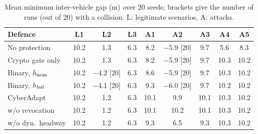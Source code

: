 \begin{table}[!t]\centering\caption{Mean minimum inter-vehicle gap (m) over 20 seeds; brackets give the number of runs (out of 20) with a collision. L: legitimate scenarios, A: attacks.}\label{tab:gap}\small\setlength{\tabcolsep}{4pt}\begin{tabular}{lcccccccc}\toprule
Defence & L1 & L2 & L3 & A1 & A2 & A3 & A4 & A5\\\midrule
No protection & 10.2 & 1.3 & 6.3 & 8.2 & $-$5.9 [20] & 9.7 & 5.6 & 8.3\\
Crypto gate only & 10.2 & 1.3 & 6.3 & 8.2 & $-$5.9 [20] & 9.7 & 10.3 & 10.2\\
Binary, $h_{\rm nom}$ & 10.2 & $-$4.2 [20] & 6.3 & 8.6 & $-$5.9 [20] & 9.7 & 10.3 & 10.2\\
Binary, $h_{\rm fail}$ & 10.2 & $-$4.1 [20] & 6.3 & 9.3 & $-$6.0 [20] & 9.7 & 10.2 & 10.2\\
CyberAdapt & 10.2 & 1.2 & 6.3 & 10.1 & 9.9 & 10.1 & 10.3 & 10.2\\
\quad w/o revocation & 10.2 & 1.2 & 6.3 & 10.1 & 10.2 & 10.1 & 10.3 & 10.2\\
\quad w/o dyn.\ headway & 10.2 & 1.2 & 6.3 & 9.3 & 6.5 & 9.3 & 10.3 & 10.2\\
\bottomrule\end{tabular}\end{table}